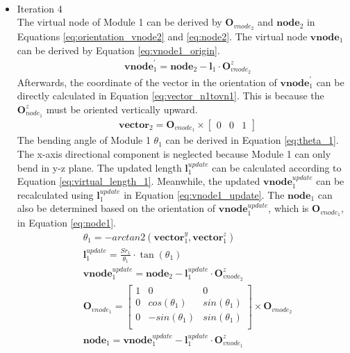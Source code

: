 \begin{itemize}
\begin{align}
        \label{eq:node2} 
    \end{align}
    \item Iteration 4 \\ %
    The virtual node of Module 1 can be derived by $\textbf{O}_{vnode_2}$ and $\textbf{node}_{2}$ in Equations 
    \ref{eq:orientation_vnode2} and \ref{eq:node2}. The virtual node $\textbf{vnode}_{1}$ can be derived by Equation 
    \ref{eq:vnode1_origin}.
    \begin{align}
        &\textbf{vnode}_{1}^{'} = \textbf{node}_{2} - \textbf{l}_{1} \cdot \textbf{O}_{vnode_2}^{z}
        \label{eq:vnode1_origin}
    \end{align}
    Afterwards, the coordinate of the vector in the orientation of $\textbf{vnode}_{1}^{'}$ can be directly calculated 
    in Equation \ref{eq:vector_n1tovn1}. This is because the $\textbf{O}_{node_1}^{z}$ must be oriented vertically upward.
    \begin{align}
        &\textbf{vector}_{2} = \textbf{O}_{vnode_1} \times \begin{bmatrix} 0 & 0 & 1 \end{bmatrix} 
        \label{eq:vector_n1tovn1} 
    \end{align}
    The bending angle of Module 1 $\theta_1$ can be derived in Equation \ref{eq:theta_1}. The x-axis directional 
    component is neglected because Module 1 can only bend in y-z plane. The updated length $\textbf{l}_{1}^{update}$ 
    can be calculated according to Equation \ref{eq:virtual_length_1}. Meanwhile, the updated 
    $\textbf{vnode}_{1}^{update}$ can be recalculated using $\textbf{l}_{1}^{update}$ in Equation \ref{eq:vnode1_update}. 
    The $\textbf{node}_1$ can also be determined based on the orientation of $\textbf{vnode}_{1}^{update}$, 
    which is $\textbf{O}_{vnode_1}$, in Equation \ref{eq:node1}.
    \begin{align}
        &\theta_1 = -arctan2(\textbf{vector}_{1}^{y},\textbf{vector}_{1}^{z})
        \label{eq:theta_1} \\
        &\textbf{l}_{1}^{update} = \frac{Sr_1}{\theta_1}\cdot \tan(\theta_1)
        \label{eq:virtual_length_1} \\
        &\textbf{vnode}_{1}^{update} = \textbf{node}_{2} - \textbf{l}_{1}^{update} \cdot \textbf{O}_{vnode_2}^{z}
        \label{eq:vnode1_update} \\
        &\textbf{O}_{vnode_1} =     
        \begin{bmatrix}
            1 & 0 & 0 \\
            0 & cos(\theta_1) & sin(\theta_1) \\
            0 & -sin(\theta_1) & sin(\theta_1) \\
        \end{bmatrix}  
        \times \textbf{O}_{vnode_2}
        \label{eq:orientation_vnode1} \\
        &\textbf{node}_1 = \textbf{vnode}_{1}^{update} - \textbf{l}_{1}^{update} \cdot \textbf{O}_{vnode_1}^{z}
        \label{eq:node1} 
    \end{align}
\end{itemize}
